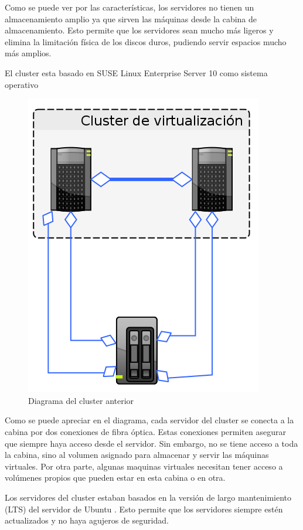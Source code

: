\documentclass[12pt,a4paper,titlepage,twoside]{report}
\begin{document}
\par Como se puede ver por las características, los servidores no tienen un almacenamiento amplio ya que sirven las máquinas desde la cabina de almacenamiento. Esto permite que los servidores sean mucho más ligeros y elimina la limitación física de los discos duros, pudiendo servir espacios mucho más amplios.
\par El cluster esta basado en SUSE Linux Enterprise Server 10 como sistema operativo
\begin{figure}[h]
\caption{Diagrama del cluster anterior}
\centering
\includegraphics[scale=0.5]{cluster-anterior}
\end{figure}
\par
Como se puede apreciar en el diagrama, cada servidor del cluster se conecta a la cabina por dos conexiones de fibra óptica. Estas conexiones permiten asegurar que siempre haya acceso desde el servidor. Sin embargo, no se tiene acceso a toda la cabina, sino al volumen asignado para almacenar y servir las máquinas virtuales. Por otra parte, algunas maquinas virtuales necesitan tener acceso a volúmenes propios que pueden estar en esta cabina o en otra. 
\par
Los servidores del cluster estaban basados en la versión de largo mantenimiento (LTS) del servidor de Ubuntu \cite{ubuntu}. Esto permite que los servidores siempre estén actualizados y no haya agujeros de seguridad.
\end{document}
